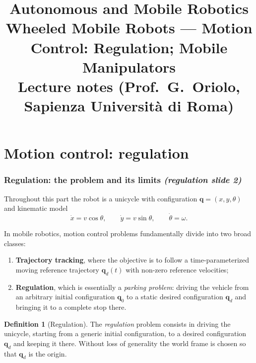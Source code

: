\documentclass[11pt,a4paper]{article}
\title{\textbf{Autonomous and Mobile Robotics}\\[2pt]
\large Wheeled Mobile Robots --- Motion Control: Regulation; Mobile Manipulators\\[2pt]
\normalsize Lecture notes (Prof.\ G.\ Oriolo, Sapienza Universit\`a di Roma)}
\author{}
\date{}
\theoremstyle{plain}
\theoremstyle{definition}
\newtheorem{definition}[theorem]{Definition}
\theoremstyle{remark}
\begin{document}
\maketitle
\tableofcontents
\bigskip

\part{Motion control: regulation}

\section{Regulation: the problem and its limits \emph{(regulation slide 2)}}

Throughout this part the robot is a unicycle with configuration $\bm q=(x,y,\theta)$ and kinematic model
\[
\dot x=v\cos\theta,\qquad \dot y=v\sin\theta,\qquad \dot\theta=\omega .
\]

In mobile robotics, motion control problems fundamentally divide into two broad classes:
\begin{enumerate}[leftmargin=*,nosep]
\item \textbf{Trajectory tracking}, where the objective is to follow a time-parameterized moving reference trajectory $\bm q_d(t)$ with non-zero reference velocities;
\item \textbf{Regulation}, which is essentially a \emph{parking problem}: driving the vehicle from an arbitrary initial configuration $\bm q_0$ to a static desired configuration $\bm q_d$ and bringing it to a complete stop there.
\end{enumerate}

\begin{definition}[Regulation]
The \emph{regulation} problem consists in driving the unicycle, starting from a generic initial configuration, to a desired configuration $\bm q_d$ and keeping it there. Without loss of generality the world frame is chosen so that $\bm q_d$ is the origin.
\end{definition}
\end{document}
